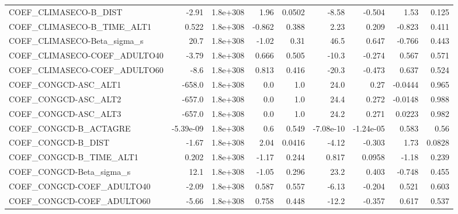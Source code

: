 \begin{tabular}{lrrrrrrrr}
COEF\_CLIMASECO-B\_DIST             &       -2.91 &     1.8e+308 &    1.96 &   0.0502 &      -8.58 &      -0.504 &         1.53 &         0.125 \\
COEF\_CLIMASECO-B\_TIME\_ALT1        &       0.522 &     1.8e+308 &  -0.862 &    0.388 &       2.23 &       0.209 &       -0.823 &         0.411 \\
COEF\_CLIMASECO-Beta\_sigma\_s       &        20.7 &     1.8e+308 &   -1.02 &     0.31 &       46.5 &       0.647 &       -0.766 &         0.443 \\
COEF\_CLIMASECO-COEF\_ADULTO40      &       -3.79 &     1.8e+308 &   0.666 &    0.505 &      -10.3 &      -0.274 &        0.567 &         0.571 \\
COEF\_CLIMASECO-COEF\_ADULTO60      &        -8.6 &     1.8e+308 &   0.813 &    0.416 &      -20.3 &      -0.473 &        0.637 &         0.524 \\
COEF\_CONGCD-ASC\_ALT1              &      -658.0 &     1.8e+308 &     0.0 &      1.0 &       24.0 &        0.27 &      -0.0444 &         0.965 \\
COEF\_CONGCD-ASC\_ALT2              &      -657.0 &     1.8e+308 &     0.0 &      1.0 &       24.4 &       0.272 &      -0.0148 &         0.988 \\
COEF\_CONGCD-ASC\_ALT3              &      -657.0 &     1.8e+308 &     0.0 &      1.0 &       24.2 &       0.271 &       0.0223 &         0.982 \\
COEF\_CONGCD-B\_ACTAGRE             &   -5.39e-09 &     1.8e+308 &     0.6 &    0.549 &  -7.08e-10 &   -1.24e-05 &        0.583 &          0.56 \\
COEF\_CONGCD-B\_DIST                &       -1.67 &     1.8e+308 &    2.04 &   0.0416 &      -4.12 &      -0.303 &         1.73 &        0.0828 \\
COEF\_CONGCD-B\_TIME\_ALT1           &       0.202 &     1.8e+308 &   -1.17 &    0.244 &      0.817 &      0.0958 &        -1.18 &         0.239 \\
COEF\_CONGCD-Beta\_sigma\_s          &        12.1 &     1.8e+308 &   -1.05 &    0.296 &       23.2 &       0.403 &       -0.748 &         0.455 \\
COEF\_CONGCD-COEF\_ADULTO40         &       -2.09 &     1.8e+308 &   0.587 &    0.557 &      -6.13 &      -0.204 &        0.521 &         0.603 \\
COEF\_CONGCD-COEF\_ADULTO60         &       -5.66 &     1.8e+308 &   0.758 &    0.448 &      -12.2 &      -0.357 &        0.617 &         0.537 \\

\end{tabular}
